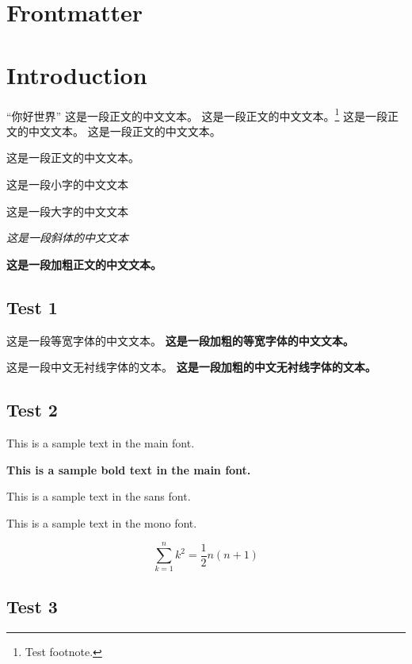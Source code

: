 \documentclass[10pt, a4paper, fontset=none, no-math]{ctexbook}
\begin{document}
\frontmatter

\chapter{Frontmatter}
\lipsum[5-10]

\mainmatter

\chapter{Introduction}
``你好世界''
这是一段正文的中文文本。
这是一段正文的中文文本。\footnote{Test footnote.}
这是一段正文的中文文本。
这是一段正文的中文文本。

这是一段正文的中文文本。

{\small 这是一段小字的中文文本}

{\Large 这是一段大字的中文文本}

{\itshape 这是一段斜体的中文文本}

\textbf{这是一段加粗正文的中文文本。}

\section{Test 1}

{
这是一段等宽字体的中文文本。
\textbf{这是一段加粗的等宽字体的中文文本。}
}

{
这是一段中文无衬线字体的文本。
\textbf{这是一段加粗的中文无衬线字体的文本。}
}

\section{Test 2}

This is a sample text in the main font. 

\textbf{This is a sample bold text in the main font.}

{\sffamily This is a sample text in the sans font.}

{\ttfamily This is a sample text in the mono font.}

\begin{equation}
    \sum_{k=1}^n k^2 = \frac{1}{2} n (n+1)
\end{equation}

\section{Test 3}
\end{document}
